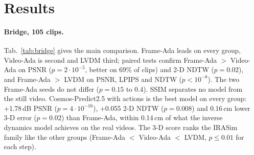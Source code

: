 \section{Results}
\label{sec:results}

\paragraph{Bridge, 105 clips.}
Tab.~\ref{tab:bridge} gives the main comparison.
Frame-Ada leads on every group, Video-Ada is second and LVDM third; paired tests confirm Frame-Ada $>$ Video-Ada on PSNR ($p=2\cdot10^{-5}$, better on 69\% of clips) and 2-D NDTW ($p=0.02$), and Frame-Ada $>$ LVDM on PSNR, LPIPS and NDTW ($p<10^{-8}$).
The two Frame-Ada seeds do not differ ($p=0.15$ to $0.4$).
SSIM separates no model from the still video.
Cosmos-Predict2.5 with actions is the best model on every group: +1.78\,dB PSNR ($p=4\cdot10^{-16}$), +0.055 2-D NDTW ($p=0.008$) and 0.16\,cm lower 3-D error ($p=0.02$) than Frame-Ada, within 0.14\,cm of what the inverse dynamics model achieves on the real videos.
The 3-D score ranks the IRASim family like the other groups (Frame-Ada $<$ Video-Ada $<$ LVDM, $p\le0.01$ for each step).

\begin{table}[t]
\centering
\footnotesize
\setlength{\tabcolsep}{2.5pt}
\caption{Bridge, 105 clips. Visual metrics over frames 1 to 15; 2-D track on the 96 clips with an end-effector point; 3-D: mean end-effector position error of the path read back by the inverse dynamics model (Sec.~\ref{sec:improve}). Best in bold, second underlined (references excluded).}
\label{tab:bridge}
\end{table}

